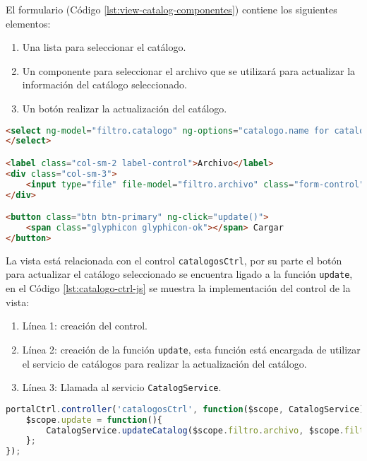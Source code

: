 El formulario (Código \ref{lst:view-catalog-componentes}) contiene los siguientes elementos:
\begin{enumerate}
	\item Una lista para seleccionar el catálogo.
	\item Un componente para seleccionar el archivo que se utilizará para actualizar la información del catálogo seleccionado.
	\item Un botón realizar la actualización del catálogo.
\end{enumerate}
\begin{lstlisting}[language=HTML, captionpos=b, caption={Elementos del formulario para seleccionar catálogo.}, label={lst:view-catalog-componentes}]
<select ng-model="filtro.catalogo" ng-options="catalogo.name for catalogo in catalogos" class="form-control">
</select>

<label class="col-sm-2 label-control">Archivo</label>
<div class="col-sm-3">
	<input type="file" file-model="filtro.archivo" class="form-control"/>
</div>

<button class="btn btn-primary" ng-click="update()">
	<span class="glyphicon glyphicon-ok"></span> Cargar
</button>
\end{lstlisting}

La vista está relacionada con el control \texttt{catalogosCtrl}, por su parte el botón para actualizar el catálogo seleccionado se encuentra ligado a la función \texttt{update}, en el Código \ref{lst:catalogo-ctrl-js} se muestra la implementación del control de la vista:

\begin{enumerate}
	\item Línea 1: creación del control. 
	\item Línea 2: creación de la función \texttt{update}, esta función está encargada de utilizar el servicio de catálogos para realizar la actualización del catálogo.
	\item Línea 3: Llamada al servicio \texttt{CatalogService}.
\end{enumerate}

\begin{lstlisting}[language=Javascript, caption={Controlador de la vista Catálogo.}, captionpos=b, label={lst:catalogo-ctrl-js}]
portalCtrl.controller('catalogosCtrl', function($scope, CatalogService){
	$scope.update = function(){
		CatalogService.updateCatalog($scope.filtro.archivo, $scope.filtro.catalogo.name);
	};
});

\end{lstlisting}


